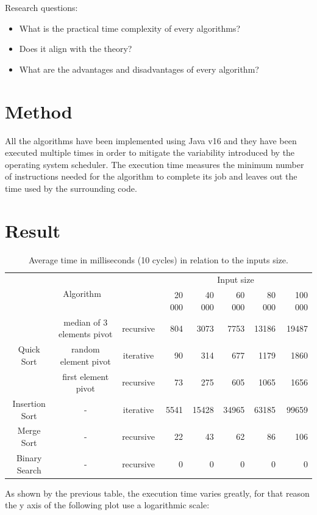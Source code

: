 \documentclass{article}
\begin{document}
Research questions:
\begin{itemize}
    \item What is the practical time complexity of every algorithms?
    \item Does it align with the theory?
    \item What are the advantages and disadvantages of every algorithm?
\end{itemize}

\section{Method}
All the algorithms have been implemented using Java v16 and they have been executed multiple times in order to mitigate the variability introduced by the operating system scheduler.
The execution time measures the minimum number of instructions needed for the algorithm to complete its job and leaves out the time used by the surrounding code.

\newpage
\section{Result}

\begin{table}[h!]
\begin{center}
\begin{tabular}{| c | c | c | r | r | r | r | r |} 
 \hline
 \multicolumn{3}{|c|}{\multirow{2}{*}{Algorithm}} & \multicolumn{5}{c|}{Input size} \\
 \cline{4-8}
 \multicolumn{3}{|c|}{} & 20 000 & 40 000 & 60 000 & 80 000 & 100 000 \\
 \hline
 \multirow{3}{*}{Quick Sort}
 & median of 3 elements pivot
 & recursive
 & 804 & 3073 & 7753 & 13186 & 19487 \\
 \cline{2-8}
 & random element pivot
 & iterative
 & 90 & 314 & 677 & 1179 & 1860 \\
 \cline{2-8}
 & first element pivot
 & recursive
 & 73 & 275 & 605 & 1065 & 1656 \\
 \hline
 Insertion Sort
 & - & iterative
 & 5541 & 15428 & 34965 & 63185 & 99659 \\ 
 \hline
 Merge Sort
 & - & recursive
 & 22 & 43 & 62 & 86 & 106 \\ 
 \hline
 Binary Search
 & - & recursive
 & 0 & 0 & 0 & 0 & 0 \\ 
 \hline
\end{tabular}
\caption{Average time in milliseconds (10 cycles) in relation to the inputs size.}
\end{center}
\end{table}
As shown by the previous table, the execution time varies greatly, for that reason the y axis of the following plot use a logarithmic scale:
\end{document}

